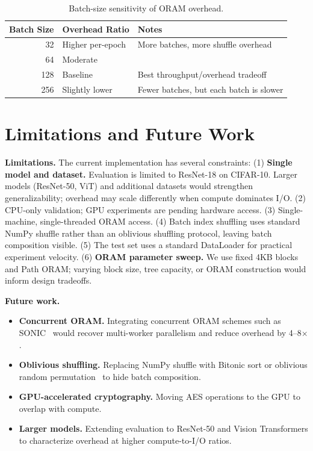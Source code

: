 \documentclass[11pt]{article}
\begin{document}
\begin{table}[ht]
\centering
\caption{Batch-size sensitivity of ORAM overhead.}
\label{tab:batch}
\begin{tabular}{@{}rll@{}}
\toprule
\textbf{Batch Size} & \textbf{Overhead Ratio} & \textbf{Notes} \\
\midrule
32  & Higher per-epoch & More batches, more shuffle overhead \\
64  & Moderate         & \\
128 & Baseline         & Best throughput/overhead tradeoff \\
256 & Slightly lower   & Fewer batches, but each batch is slower \\
\bottomrule
\end{tabular}
\end{table}

\section{Limitations and Future Work}
\label{sec:limitations}

\textbf{Limitations.}
The current implementation has several constraints:
(1) \textbf{Single model and dataset.} Evaluation is limited to ResNet-18 on CIFAR-10. Larger models (ResNet-50, ViT) and additional datasets would strengthen generalizability; overhead may scale differently when compute dominates I/O.
(2) CPU-only validation; GPU experiments are pending hardware access.
(3) Single-machine, single-threaded ORAM access.
(4) Batch index shuffling uses standard NumPy shuffle rather than an oblivious shuffling protocol, leaving batch composition visible.
(5) The test set uses a standard DataLoader for practical experiment velocity.
(6) \textbf{ORAM parameter sweep.} We use fixed 4KB blocks and Path ORAM; varying block size, tree capacity, or ORAM construction would inform design tradeoffs.

\textbf{Future work.}
\begin{itemize}
    \item \textbf{Concurrent ORAM.} Integrating concurrent ORAM schemes such as SONIC~\cite{talur2026} would recover multi-worker parallelism and reduce overhead by 4--8$\times$.
    \item \textbf{Oblivious shuffling.} Replacing NumPy shuffle with Bitonic sort or oblivious random permutation~\cite{ngai2024} to hide batch composition.
    \item \textbf{GPU-accelerated cryptography.} Moving AES operations to the GPU to overlap with compute.
    \item \textbf{Larger models.} Extending evaluation to ResNet-50 and Vision Transformers to characterize overhead at higher compute-to-I/O ratios.
\end{itemize}
\end{document}
